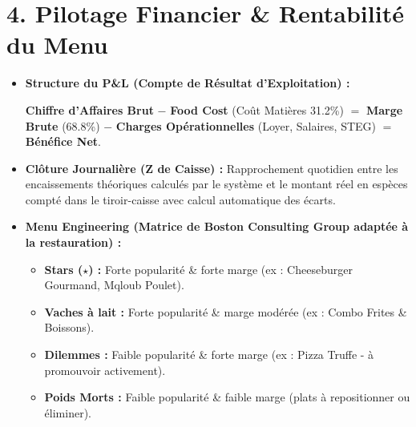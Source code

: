 \documentclass[10pt,a4paper]{article}
\begin{document}
\section*{\textcolor{restivored}{4. Pilotage Financier \& Rentabilité du Menu}}
\begin{itemize}[leftmargin=*,itemsep=2pt]
    \item \textbf{Structure du P\&L (Compte de Résultat d'Exploitation) :}
    \begin{center}
        \textbf{Chiffre d'Affaires Brut} $-$ \textbf{Food Cost} (Coût Matières 31.2\%) $=$ \textbf{Marge Brute} (68.8\%) $-$ \textbf{Charges Opérationnelles} (Loyer, Salaires, STEG) $=$ \textbf{Bénéfice Net}.
    \end{center}
    \item \textbf{Clôture Journalière (Z de Caisse) :} Rapprochement quotidien entre les encaissements théoriques calculés par le système et le montant réel en espèces compté dans le tiroir-caisse avec calcul automatique des écarts.
    \item \textbf{Menu Engineering (Matrice de Boston Consulting Group adaptée à la restauration) :}
    \begin{itemize}
        \item \textbf{Stars ($\star$) :} Forte popularité \& forte marge (ex : Cheeseburger Gourmand, Mqloub Poulet).
        \item \textbf{Vaches à lait :} Forte popularité \& marge modérée (ex : Combo Frites \& Boissons).
        \item \textbf{Dilemmes :} Faible popularité \& forte marge (ex : Pizza Truffe - à promouvoir activement).
        \item \textbf{Poids Morts :} Faible popularité \& faible marge (plats à repositionner ou éliminer).
    \end{itemize}
\end{itemize}

\end{document}
